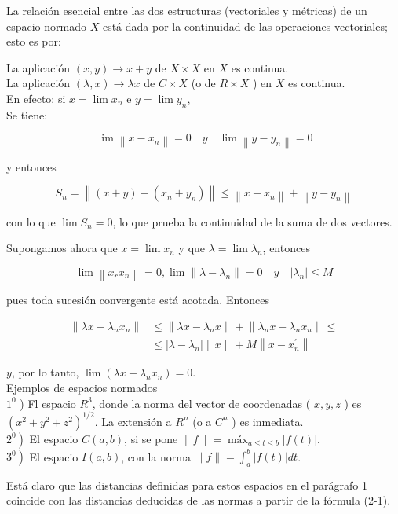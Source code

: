 \documentclass[10pt]{article}
\theoremstyle{plain}
\theoremstyle{definition}
\theoremstyle{remark}
\begin{document}
La relación esencial entre las dos estructuras (vectoriales y métricas) de un espacio normado $X$ está dada por la continuidad de las operaciones vectoriales; esto es por:

La aplicación $(x, y) \rightarrow x+y$ de $X \times X$ en $X$ es continua.\\
La aplicación $(\lambda, x) \rightarrow \lambda x$ de $C \times X$ (o de $R \times X$ ) en $X$ es continua.\\
En efecto: si $x=\lim x_{n}$ e $y=\lim y_{n}$,\\
Se tiene:

$$
\lim \left\|x-x_{n}\right\|=0 \quad y \quad \lim \left\|y-y_{n}\right\|=0
$$

y entonces

$$
S_{n}=\left\|(x+y)-\left(x_{n}+y_{n}\right)\right\| \leqslant\left\|x-x_{n}\right\|+\left\|y-y_{n}\right\|
$$

con lo que $\lim S_{n}=0$, lo que prueba la continuidad de la suma de dos vectores.

Supongamos ahora que $x=\lim x_{n}$ y que $\lambda=\lim \lambda_{n}$, entonces

$$
\lim \left\|x_{r} x_{n}\right\|=0, \lim \left\|\lambda-\lambda_{n}\right\|=0 \quad y \quad\left|\lambda_{n}\right| \leqslant M
$$

pues toda sucesión convergente está acotada. Entonces

$$
\begin{aligned}
\left\|\lambda x-\lambda_{n} x_{n}\right\| & \leqslant\left\|\lambda x-\lambda_{n} x\right\|+\left\|\lambda_{n} x-\lambda_{n} x_{n}\right\| \leqslant \\
& \leqslant\left|\lambda-\lambda_{n}\right|\|x\|+M\left\|x-x_{n}^{\prime}\right\|
\end{aligned}
$$

$y$, por lo tanto, $\lim \left(\lambda x-\lambda_{n} x_{n}\right)=0$.\\
Ejemplos de espacios normados\\
$1^{0}$ ) Fl espacio $R^{3}$, donde la norma del vector de coordenadas ( $x, y, z$ ) es $\left(x^{2}+y^{2}+z^{2}\right)^{1 / 2}$. La extensión a $R^{n}$ (o a $C^{n}$ ) es inmediata.\\
$\left.2^{0}\right)$ El espacio $C(a, b)$, si se pone $\|f\|=\operatorname{máx}_{a \leqslant t \leqslant b}|f(t)|$.\\
$\left.3^{0}\right)$ El espacio $I(a, b)$, con la norma $\|f\|=\int_{a}^{b}|f(t)| d t$.

Está claro que las distancias definidas para estos espacios en el parágrafo 1 coincide con las distancias deducidas de las normas a partir de la fórmula (2-1).
\end{document}
